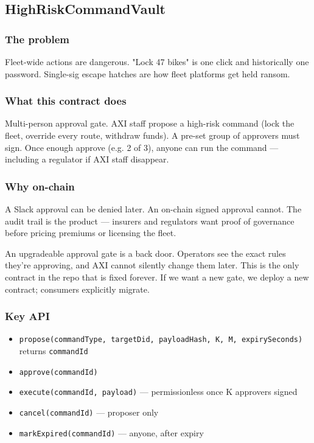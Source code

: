 \documentclass[11pt,a4paper]{article}
\begin{document}
\subsection{HighRiskCommandVault}

\subsubsection{The problem}
Fleet-wide actions are dangerous. "Lock 47 bikes" is one click and historically one password. Single-sig escape hatches are how fleet platforms get held ransom.

\subsubsection{What this contract does}
Multi-person approval gate. AXI staff propose a high-risk command (lock the fleet, override every route, withdraw funds). A pre-set group of approvers must sign. Once enough approve (e.g. 2 of 3), anyone can run the command --- including a regulator if AXI staff disappear.

\subsubsection{Why on-chain}
A Slack approval can be denied later. An on-chain signed approval cannot. The audit trail is the product --- insurers and regulators want proof of governance before pricing premiums or licensing the fleet.

\begin{warningbox}[title=Why NOT upgradeable]
An upgradeable approval gate is a back door. Operators see the exact rules they're approving, and AXI cannot silently change them later. This is the only contract in the repo that is fixed forever. If we want a new gate, we deploy a new contract; consumers explicitly migrate.
\end{warningbox}

\subsubsection{Key API}
\begin{itemize}[leftmargin=*, nosep]
  \item \texttt{propose(commandType, targetDid, payloadHash, K, M, expirySeconds)} returns \texttt{commandId}
  \item \texttt{approve(commandId)}
  \item \texttt{execute(commandId, payload)} --- permissionless once K approvers signed
  \item \texttt{cancel(commandId)} --- proposer only
  \item \texttt{markExpired(commandId)} --- anyone, after expiry
\end{itemize}
\end{document}
